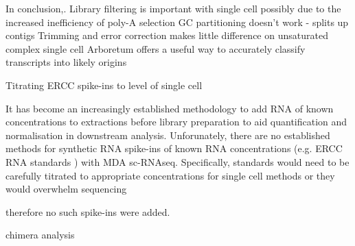 

In conclusion,.
Library filtering is important with single cell possibly due to the increased inefficiency of poly-A selection
GC partitioning doesn't work - splits up contigs
Trimming and error correction makes little difference on unsaturated complex single cell 
Arboretum offers a useful way to accurately classify transcripts into likely origins 







Titrating ERCC spike-ins to level of single cell 


It has become an increasingly established methodology to add RNA of known concentrations
to extractions before library preparation to aid quantification
and normalisation in downstream analysis. 
Unforunately, there are no established methods for synthetic RNA spike-ins
of known RNA concentrations (e.g. ERCC RNA standards \citep{Jiang2011}) with MDA
sc-RNAseq. Specifically, standards would need to be carefully titrated to appropriate
concentrations for single cell methods or they would overwhelm sequencing 


therefore no such spike-ins were added. 

chimera analysis

